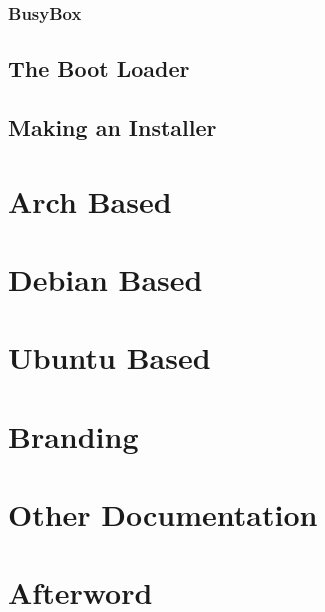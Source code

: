 \documentclass{article}
\begin{document}
		\subsubsection{BusyBox}
		\subsection{The Boot Loader}
		\subsection{Making an Installer}
\section{Arch Based}
\section{Debian Based}
\section{Ubuntu Based}
\section{Branding}
\section{Other Documentation}
\section{Afterword}
\end{document}
